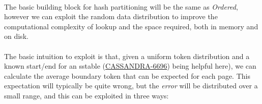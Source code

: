 \documentclass[fleqn]{article}
\begin{document}
\paragraph{}
    The basic building block for hash partitioning will be the same as \textit{Ordered}, however we can exploit
    the random data distribution to improve the computational complexity of lookup and the space required, 
    both in memory and on disk.
    \\\\
    The basic intuition to exploit is that, given a uniform token distribution and a known start/end 
    for an sstable (\href{https://issues.apache.org/jira/browse/CASSANDRA-6696}{CASSANDRA-6696}) being 
    helpful here), we can calculate the average boundary token that can be expected for 
    each page. This expectation will typically be quite wrong, but the \textit{error} will be distributed 
    over a small range, and this can be exploited in three ways:
\end{document}
